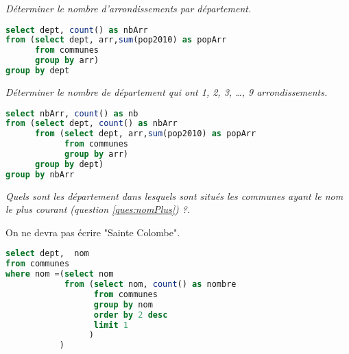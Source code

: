 \begin{Exercise}
\it Déterminer le nombre d'arrondissements par département.
\end{Exercise}
\begin{Answer}
\begin{lstlisting}[language=SQL]
select dept, count() as nbArr
from (select dept, arr,sum(pop2010) as popArr
      from communes
      group by arr)
group by dept
\end{lstlisting}
\end{Answer}
\begin{Exercise}
\it Déterminer le nombre de département qui ont 1, 2, 3, \dots, 9 arrondissements.
\end{Exercise}
\begin{Answer}
\begin{lstlisting}[language=SQL]
select nbArr, count() as nb
from (select dept, count() as nbArr
      from (select dept, arr,sum(pop2010) as popArr
            from communes
            group by arr)
      group by dept)
group by nbArr
\end{lstlisting}
\end{Answer}
\begin{Exercise}
\it Quels sont les département dans lesquels sont situés les communes ayant le nom le plus courant (question \ref{ques:nomPlus}) ?.

On ne devra pas écrire "Sainte Colombe".
\end{Exercise}
\begin{Answer}
\begin{lstlisting}[language=SQL]
select dept,  nom
from communes
where nom =(select nom  
            from (select nom, count() as nombre
                  from communes
                  group by nom
                  order by 2 desc
                  limit 1
                 )
           )
\end{lstlisting}
\end{Answer}
